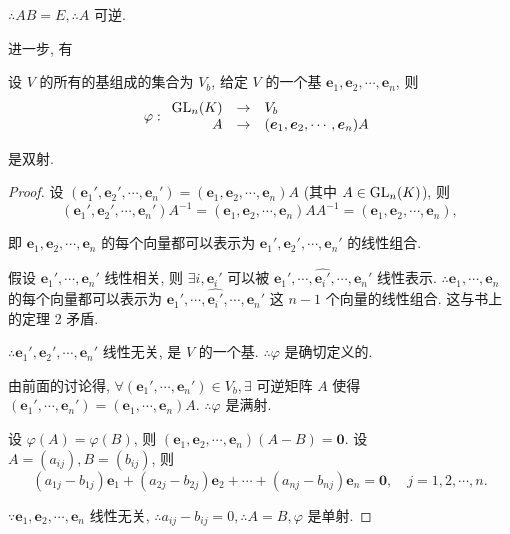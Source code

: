\documentclass[color=black,device=normal,lang=cn,mode=geye]{elegantnote}
\begin{document}
$\therefore AB=E,\therefore A$ 可逆.

进一步, 有
\begin{theorem}\label{t1.1}
    设 $V$ 的所有的基组成的集合为 $V_b$, 给定 $V$ 的一个基 $\boldsymbol{e}_1,\boldsymbol{e}_2,\cdots,\boldsymbol{e}_n$, 则
    \[\varphi:\begin{array}{rcl}
        \operatorname{GL}_n(K) & \to & V_b \\
        A & \to & (\boldsymbol{e}_1,\boldsymbol{e}_2,\cdots,\boldsymbol{e}_n)A \\
    \end{array}\]

    是双射.
\end{theorem}
\begin{proof}
    设 $(\boldsymbol{e}_1',\boldsymbol{e}_2',\cdots,\boldsymbol{e}_n')=(\boldsymbol{e}_1,\boldsymbol{e}_2,\cdots,\boldsymbol{e}_n)A$ (其中 $A\in\operatorname{GL}_n(K)$), 则
    \[(\boldsymbol{e}_1',\boldsymbol{e}_2',\cdots,\boldsymbol{e}_n')A^{-1}=(\boldsymbol{e}_1,\boldsymbol{e}_2,\cdots,\boldsymbol{e}_n)AA^{-1}=(\boldsymbol{e}_1,\boldsymbol{e}_2,\cdots,\boldsymbol{e}_n),\]

    即 $\boldsymbol{e}_1,\boldsymbol{e}_2,\cdots,\boldsymbol{e}_n$ 的每个向量都可以表示为 $\boldsymbol{e}_1',\boldsymbol{e}_2',\cdots,\boldsymbol{e}_n'$ 的线性组合.

    假设 $\boldsymbol{e}_1',\cdots,\boldsymbol{e}_n'$ 线性相关, 则 $\exists i,\boldsymbol{e}_i'$ 可以被 $\boldsymbol{e}_1',\cdots,\widehat{\boldsymbol{e}_i'},\cdots,\boldsymbol{e}_n'$ 线性表示. $\therefore\boldsymbol{e}_1,\cdots,\boldsymbol{e}_n$ 的每个向量都可以表示为 $\boldsymbol{e}_1',\cdots,\widehat{\boldsymbol{e}_i'},\cdots,\boldsymbol{e}_n'$ 这 $n-1$ 个向量的线性组合. 这与书上的定理 2 矛盾.

    $\therefore\boldsymbol{e}_1',\boldsymbol{e}_2',\cdots,\boldsymbol{e}_n'$ 线性无关, 是 $V$ 的一个基. $\therefore\varphi$ 是确切定义的.

    由前面的讨论得, $\forall(\boldsymbol{e}_1',\cdots,\boldsymbol{e}_n')\in V_b,\exists$ 可逆矩阵 $A$ 使得 $(\boldsymbol{e}_1',\cdots,\boldsymbol{e}_n')=(\boldsymbol{e}_1,\cdots,\boldsymbol{e}_n)A$. $\therefore\varphi$ 是满射.

    设 $\varphi(A)=\varphi(B)$, 则 $(\boldsymbol{e}_1,\boldsymbol{e}_2,\cdots,\boldsymbol{e}_n)(A-B)=\boldsymbol{0}$. 设 $A=(a_{ij}),B=(b_{ij})$, 则
    \[(a_{1j}-b_{1j})\boldsymbol{e}_1+(a_{2j}-b_{2j})\boldsymbol{e}_2+\cdots+(a_{nj}-b_{nj})\boldsymbol{e}_n=\boldsymbol{0},\quad j=1,2,\cdots,n.\]

    $\because\boldsymbol{e}_1,\boldsymbol{e}_2,\cdots,\boldsymbol{e}_n$ 线性无关, $\therefore a_{ij}-b_{ij}=0,\therefore A=B,\varphi$ 是单射.
\end{proof}
\end{document}
